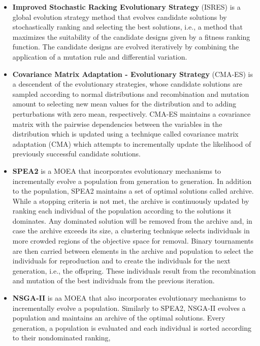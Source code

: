 \begin{itemize}
	\item \textbf{Improved Stochastic Racking Evolutionary Strategy} (ISRES) \cite{Runarsson2000} is a global evolution strategy method that evolves candidate solutions by stochastically ranking and selecting the best solutions, i.e., a method that maximizes the suitability of the candidate designs given by a fitness ranking function. The candidate designs are evolved iteratively by combining the application of a mutation rule and differential variation.
			
	\item \textbf{Covariance Matrix Adaptation - Evolutionary Strategy} (CMA-ES) \cite{Hansen2006} is a descendent of the evolutionary strategies, whose candidate solutions are sampled according to normal distributions and recombination and mutation amount to selecting new mean values for the distribution and to adding perturbations with zero mean, respectively. CMA-ES maintains a covariance matrix with the pairwise dependencies between the variables in the distribution which is updated using a technique called covariance matrix adaptation (CMA) which attempts to incrementally update the likelihood of previously successful candidate solutions.
	
	\item \textbf{SPEA2} \cite{Zitzler2001SPEA2} is a \ac{MOEA} that incorporates evolutionary mechanisms to incrementally evolve a population from generation to generation. In addition to the population, SPEA2 maintains a set of optimal solutions called archive. While a stopping criteria is not met, the archive is continuously updated by ranking each individual of the population according to the solutions it dominates. Any dominated solution will be removed from the archive and, in case the archive exceeds its size, a clustering technique selects individuals in more crowded regions of the objective space for removal. Binary tournaments are then carried between elements in the archive and population to select the individuals for reproduction and to create the individuals for the next generation, i.e., the offspring. These individuals result from the recombination and mutation of the best individuals from the previous iteration. 
	
	\item \textbf{NSGA-II} \cite{Deb2002} is aa \ac{MOEA} that also incorporates evolutionary mechanisms to incrementally evolve a population. Similarly to SPEA2, NSGA-II evolves a population and maintains an archive of the optimal solutions. Every generation, a population is evaluated and each individual is sorted according to their nondominated ranking, 
	

\end{itemize}
